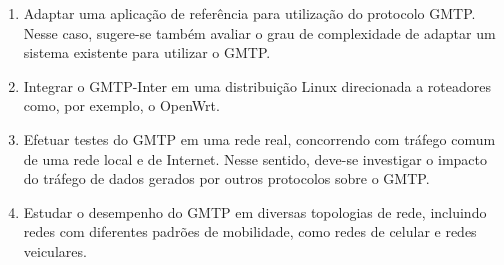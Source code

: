 \begin{enumerate}
\item Adaptar uma aplicação de referência para utilização do protocolo GMTP. Nesse caso, sugere-se também avaliar o grau de complexidade de adaptar um sistema existente para utilizar o GMTP.

\item Integrar o GMTP-Inter em uma distribuição Linux direcionada a roteadores como, por exemplo, o OpenWrt.

\item Efetuar testes do GMTP em uma rede real, concorrendo com tráfego comum de uma rede local e de Internet. Nesse sentido, deve-se investigar o impacto do tráfego de dados gerados por outros protocolos sobre o GMTP.

\item Estudar o desempenho do GMTP em diversas topologias de rede, incluindo redes com diferentes padrões de mobilidade, como redes de celular e redes veiculares.

\end{enumerate}

